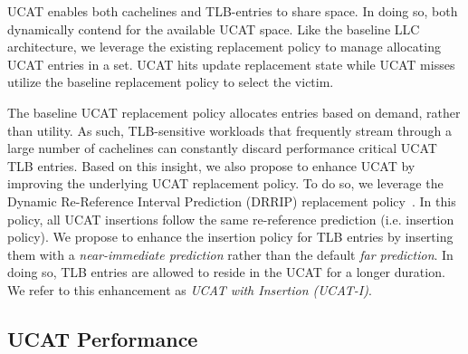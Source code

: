 UCAT enables both cachelines and TLB-entries to share space. In doing
so, both dynamically contend for the available UCAT space. Like the
baseline LLC architecture, we leverage the existing replacement policy
to manage allocating UCAT entries in a set. UCAT hits update
replacement state while UCAT misses utilize the baseline replacement
policy to select the victim.

The baseline UCAT replacement policy allocates entries based on
demand, rather than utility. As such, TLB-sensitive workloads that
frequently stream through a large number of cachelines can constantly
discard performance critical UCAT TLB entries. Based on this insight,
we also propose to enhance UCAT by improving the underlying UCAT
replacement policy. To do so, we leverage the Dynamic Re-Reference
Interval Prediction (DRRIP) replacement policy~\cite{}. In this
policy, all UCAT insertions follow the same re-reference prediction
(i.e. insertion policy). We propose to enhance the insertion policy
for TLB entries by inserting them with a {\em near-immediate
prediction} rather than the default {\em far prediction}. In doing so,
TLB entries are allowed to reside in the UCAT for a longer duration.
We refer to this enhancement as {\em UCAT with Insertion (UCAT-I)}.

% 
% 

\subsection{UCAT Performance}

